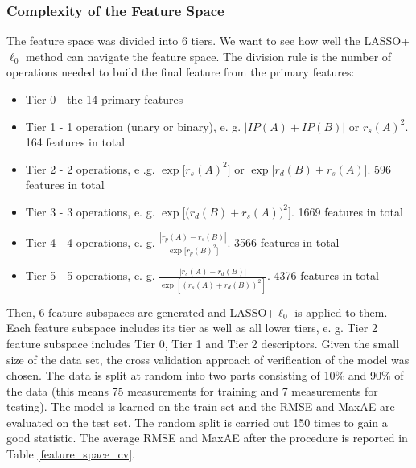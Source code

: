 \documentclass[11pt,oneside,czech,american]{book} %
\theoremstyle{plain}
\theoremstyle{definition}
\begin{document}
\subsubsection{Complexity of the Feature Space} \label{complexity}
The feature space was divided into 6 tiers. We want to see how well the LASSO+$\ell_{0}$ method can navigate the feature space. The division rule is the number of operations needed to build the final feature from the primary features:
\begin{itemize}
	\item Tier 0 - the 14 primary features
	\item Tier 1 - 1 operation (unary or binary), e. g. $|IP(A)+IP(B)|$ or $r_s(A)^2$. 164 features in total
	\item Tier 2 - 2 operations, e .g. $\exp\big[r_s(A)^2\big]$ or $ \exp\big[r_d(B) + r_s(A)\big]$. 596 features in total
	\item Tier 3 - 3 operations, e. g. $\exp\big[\big(r_d(B) + r_s(A)\big)^2 \big]$. 1669 features in total
	\item Tier 4 - 4 operations, e. g. $\frac{|r_p(A)-r_s(B)|}{\exp\big[r_p(B)^2\big]}$. 3566 features in total
	\item Tier 5 - 5 operations, e. g. $\frac{|r_s(A)-r_d(B)|}{\exp[(r_s(A)+r_d(B))^2]}$. 4376 features in total
\end{itemize}
Then, 6 feature subspaces are generated and LASSO+$\ell_{0}$ is applied to them. Each feature subspace includes its tier as well as all lower tiers, e. g. Tier 2 feature subspace includes Tier 0, Tier 1 and Tier 2 descriptors. Given the small size of the data set, the cross validation approach of verification of the model was chosen. The data is split at random into two parts consisting of 10\% and 90\% of the data (this means 75 measurements for training and 7 measurements for testing). The model is learned on the train set and the RMSE and MaxAE are evaluated on the test set. The random split is carried out 150 times to gain a good statistic. The average RMSE and MaxAE after the procedure is reported in Table \ref{feature_space_cv}.
\end{document}
